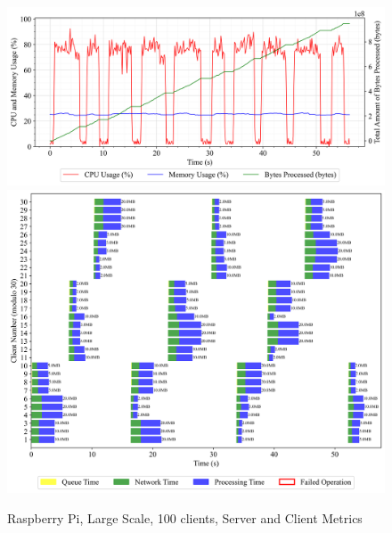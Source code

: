 \newpage
\begin{figure}[h!t]
    \begin{center}
    \label{Fig:A1.16}
    \caption{Raspberry Pi, Large Scale, 100 clients, Server and Client Metrics}
    \includegraphics[width=\xLarge\textwidth]{Chapter4/Results/raspberry-pi_results/raspberry-pi_large_scale_1000_20241004_140150.db_server_metrics.png}
    \includegraphics[width=\xLarge\textwidth]{Chapter4/Results/raspberry-pi_results/raspberry-pi_large_scale_1000_20241004_140150.db_client_tasks.png}
    \end{center}
\end{figure}

\newpage
